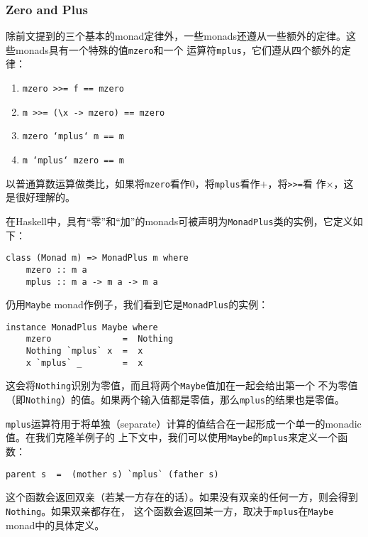 \subsubsection{Zero and Plus}
\indent{}除前文提到的三个基本的monad定律外，一些monads还遵从一些额外的定律。这些monads具有一个特殊的值\texttt{mzero}和一个
运算符\texttt{mplus}，它们遵从四个额外的定律：
\begin{enumerate}
\item \texttt{mzero >>= f  ==  mzero}
\item \texttt{m >>= (\textbackslash x -> mzero)  ==  mzero}
\item \texttt{mzero `mplus` m  ==  m}
\item \texttt{m `mplus` mzero  ==  m}
\end{enumerate}
\noindent{}以普通算数运算做类比，如果将\texttt{mzero}看作0，将\texttt{mplus}看作$+$，将\texttt{>>=}看
作$\times$，这是很好理解的。\clearpage

\noindent{}在Haskell中，具有“零”和“加”的monads可被声明为\texttt{MonadPlus}类的实例，它定义如下：
\begin{verbatim}
class (Monad m) => MonadPlus m where
    mzero :: m a
    mplus :: m a -> m a -> m a
\end{verbatim}
\noindent{}仍用\texttt{Maybe} monad作例子，我们看到它是\texttt{MonadPlus}的实例：
\begin{verbatim}
instance MonadPlus Maybe where
    mzero              =  Nothing
    Nothing `mplus` x  =  x
    x `mplus` _        =  x
\end{verbatim}
\noindent{}这会将\texttt{Nothing}识别为零值，而且将两个\texttt{Maybe}值加在一起会给出第一个
不为零值（即\texttt{Nothing}）的值。如果两个输入值都是零值，那么\texttt{mplus}的结果也是零值。

\indent{}\texttt{mplus}运算符用于将单独（separate）计算的值结合在一起形成一个单一的monadic值。在我们克隆羊例子的
上下文中，我们可以使用\texttt{Maybe}的\texttt{mplus}来定义一个函数：
\begin{verbatim}
parent s  =  (mother s) `mplus` (father s)
\end{verbatim}
\noindent{}这个函数会返回双亲（若某一方存在的话）。如果没有双亲的任何一方，则会得到\texttt{Nothing}。如果双亲都存在，
这个函数会返回某一方，取决于\texttt{mplus}在\texttt{Maybe} monad中的具体定义。

